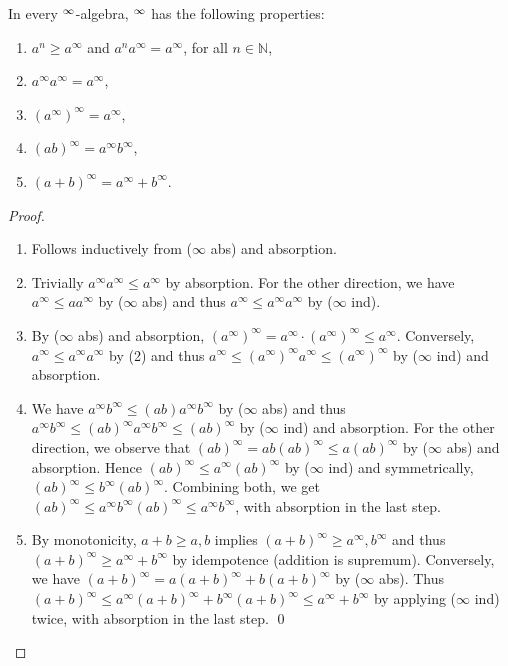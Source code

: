 \documentclass[english,runningheads,a4paper,envcountsame]{llncs}
\newcommand{\NN}{\mathbb{N}}
\begin{document}
\begin{lemma}\label{lemInfpowProperties}
In every ${}^\infty$-algebra, ${}^\infty$ has the following properties:
\begin{enumerate}
\item $a^n \ge a^\infty$ and $a^n a^\infty = a^\infty$, for all $n \in \NN$,
\item $a^\infty a^\infty = a^\infty$,
\item $(a^\infty)^\infty = a^\infty$,
\item $(ab)^\infty = a^\infty b^\infty$,
\item $(a+b)^\infty = a^\infty + b^\infty$.
\end{enumerate}
\end{lemma}
\begin{proof}
\begin{enumerate}
\setlength{\itemsep}{.5em}
\item Follows inductively from ($\infty$ abs) and absorption.

\item Trivially $a^\infty a^\infty \le a^\infty$ by absorption.
For the other direction, we have $a^\infty \le aa^\infty$ by ($\infty$ abs) and thus $a^\infty \le a^\infty a^\infty$ by ($\infty$ ind).

\item By ($\infty$ abs) and absorption, $(a^\infty)^\infty = a^\infty \cdot (a^\infty)^\infty \le a^\infty$.
Conversely, $a^\infty \le a^\infty a^\infty$ by (2) and thus $a^\infty \le (a^\infty)^\infty a^\infty \le (a^\infty)^\infty$ by ($\infty$ ind) and absorption.

\item We have $a^\infty b^\infty \le (ab) a^\infty b^\infty$ by ($\infty$ abs) and thus $a^\infty b^\infty \le (ab)^\infty a^\infty b^\infty \le (ab)^\infty$ by ($\infty$ ind) and absorption.
For the other direction, we observe that $(ab)^\infty = ab(ab)^\infty \le a(ab)^\infty$ by ($\infty$ abs) and absorption.
Hence $(ab)^\infty \le a^\infty (ab)^\infty$ by ($\infty$ ind) and symmetrically, $(ab)^\infty \le b^\infty (ab)^\infty$.
Combining both, we get $(ab)^\infty \le a^\infty b^\infty (ab)^\infty \le a^\infty b^\infty$, with absorption in the last step.

\item By monotonicity, $a+b \ge a,b$ implies $(a+b)^\infty \ge a^\infty, b^\infty$ and thus $(a+b)^\infty \ge a^\infty + b^\infty$ by idempotence (addition is supremum).
Conversely, we have $(a+b)^\infty = a(a+b)^\infty + b(a+b)^\infty$ by ($\infty$ abs).
Thus $(a+b)^\infty \le a^\infty (a+b)^\infty + b^\infty(a+b)^\infty \le a^\infty + b^\infty$ by applying ($\infty$ ind) twice, with absorption in the last step. \qed
\end{enumerate}
\end{proof}
\end{document}
